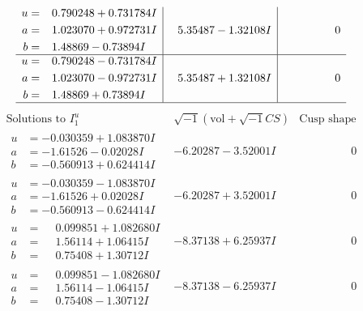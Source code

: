 \documentclass[1p]{elsarticle_modified}
\theoremstyle{definition}
\newcommand{\I}{\sqrt{-1}}
\begin{document}
$$\begin{array}{c|c|c}
\begin{aligned}
u &= \phantom{-}0.790248 + 0.731784 I \\
a &= \phantom{-}1.023070 + 0.972731 I \\
b &= \phantom{-}1.48869 - 0.73894 I\end{aligned}
 & \phantom{-}5.35487 - 1.32108 I & \phantom{-0.000000 } 0 \\ \hline\begin{aligned}
u &= \phantom{-}0.790248 - 0.731784 I \\
a &= \phantom{-}1.023070 - 0.972731 I \\
b &= \phantom{-}1.48869 + 0.73894 I\end{aligned}
 & \phantom{-}5.35487 + 1.32108 I & \phantom{-0.000000 } 0\\
 \hline 
 \end{array}$$\newpage$$\begin{array}{c|c|c}  
\text{Solutions to }I^u_{1}& \I (\text{vol} + \sqrt{-1}CS) & \text{Cusp shape}\\
 \hline 
\begin{aligned}
u &= -0.030359 + 1.083870 I \\
a &= -1.61526 - 0.02028 I \\
b &= -0.560913 + 0.624414 I\end{aligned}
 & -6.20287 - 3.52001 I & \phantom{-0.000000 } 0 \\ \hline\begin{aligned}
u &= -0.030359 - 1.083870 I \\
a &= -1.61526 + 0.02028 I \\
b &= -0.560913 - 0.624414 I\end{aligned}
 & -6.20287 + 3.52001 I & \phantom{-0.000000 } 0 \\ \hline\begin{aligned}
u &= \phantom{-}0.099851 + 1.082680 I \\
a &= \phantom{-}1.56114 + 1.06415 I \\
b &= \phantom{-}0.75408 + 1.30712 I\end{aligned}
 & -8.37138 + 6.25937 I & \phantom{-0.000000 } 0 \\ \hline\begin{aligned}
u &= \phantom{-}0.099851 - 1.082680 I \\
a &= \phantom{-}1.56114 - 1.06415 I \\
b &= \phantom{-}0.75408 - 1.30712 I\end{aligned}
 & -8.37138 - 6.25937 I & \phantom{-0.000000 } 0 \\ \hline\begin{aligned}

\end{aligned}
\end{array}$$
\end{document}
